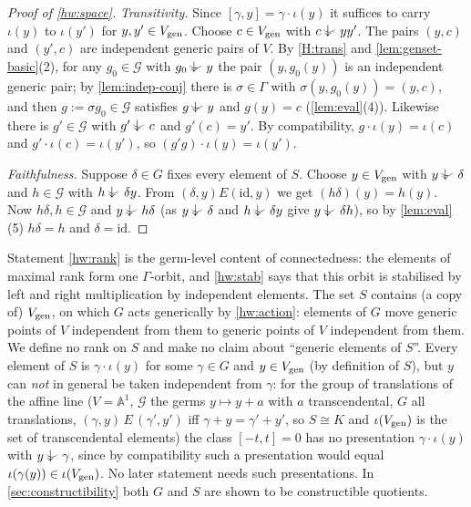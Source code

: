 \begin{proof}[Proof of \ref{hw:space}]
\emph{Transitivity.}  Since $[\gamma,y]=\gamma\cdot\iota(y)$ it suffices to carry $\iota(y)$
to $\iota(y')$ for $y,y'\in V_{\operatorname{gen}}$.  Choose $c\in V_{\operatorname{gen}}$ with $c\ind{}yy'$.
The pairs $(y,c)$ and $(y',c)$ are independent generic pairs of $V$.  By \ref{H:trans}
and \cref{lem:genset-basic}(2), for any $g_0\in\mathcal G$ with $g_0\ind{}y$ the pair
$(y,g_0(y))$ is an independent generic pair; by \cref{lem:indep-conj} there is
$\sigma\in\Gamma$ with $\sigma(y,g_0(y))=(y,c)$, and then $g:=\sigma g_0\in\mathcal G$
satisfies $g\ind{}y$ and $g(y)=c$ (\cref{lem:eval}(4)).  Likewise there is $g'\in\mathcal G$
with $g'\ind{}c$ and $g'(c)=y'$.  By compatibility, $g\cdot\iota(y)=\iota(c)$ and
$g'\cdot\iota(c)=\iota(y')$, so $(g'g)\cdot\iota(y)=\iota(y')$.

\emph{Faithfulness.}  Suppose $\delta\in G$ fixes every element of $S$.  Choose
$y\in V_{\operatorname{gen}}$ with $y\ind{}\delta$ and $h\in\mathcal G$ with $h\ind{}\delta y$.  From
$(\delta,y)E(\mathrm{id},y)$ we get $(h\delta)(y)=h(y)$.  Now $h\delta,h\in\mathcal G$ and
$y\ind{}h\delta$ (as $y\ind{}\delta$ and $h\ind{}\delta y$ give $y\ind{}\delta h$), so by
\cref{lem:eval}(5) $h\delta=h$ and $\delta=\mathrm{id}$.
\end{proof}

\begin{remark}
\label{rem:connected}
Statement \ref{hw:rank} is the germ-level content of connectedness: the elements of
maximal rank form one $\Gamma$-orbit, and \ref{hw:stab} says that this orbit is
stabilised by left and right multiplication by independent elements.  The set $S$
contains (a copy of) $V_{\operatorname{gen}}$, on which $G$ acts generically by \ref{hw:action}:
elements of $G$ move generic points of $V$ independent from them to generic points of
$V$ independent from them.  We define no rank on $S$ and make no claim about ``generic
elements of $S$''.  Every element of $S$ is $\gamma\cdot\iota(y)$ for some $\gamma\in G$ and
$y\in V_{\operatorname{gen}}$ (by definition of $S$), but $y$ can \emph{not} in general be taken
independent from $\gamma$: for the group of translations of the affine line
($V=\mathbb A^1$, $\mathcal G$ the germs $y\mapsto y+a$ with $a$ transcendental, $G$ all
translations, $(\gamma,y)\,E\,(\gamma',y')$ iff $\gamma+y=\gamma'+y'$, so $S\cong K$ and
$\iota(V_{\operatorname{gen}})$ is the set of transcendental elements) the class $[-t,t]=0$ has no
presentation $\gamma\cdot\iota(y)$ with $y\ind{}\gamma$, since by compatibility such a
presentation would equal $\iota(\gamma(y))\in\iota(V_{\operatorname{gen}})$.  No later statement needs
such presentations.  In \cref{sec:constructibility} both $G$ and $S$ are shown to be
constructible quotients.
\end{remark}

